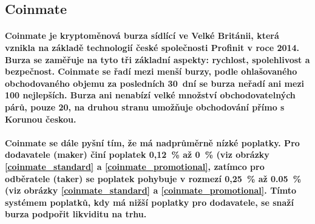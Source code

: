 \documentclass[thesis=B,czech]{FITthesis}[2019/03/21]
\begin{document}
\subsection{Coinmate}
\paragraph{
Coinmate je kryptoměnová burza sídlící ve Velké Británii, která vznikla na základě technologií české společnosti Profinit v roce 2014. Burza se zaměřuje na tyto tři základní aspekty: rychlost, spolehlivost a bezpečnost. Coinmate se řadí mezi menší burzy, podle ohlašovaného obchodovaného objemu za posledních 30~dní se burza neřadí ani mezi 100 nejlepších. \cite{coinmarketcap} Burza ani nenabízí velké množství obchodovatelných párů, pouze 20, na druhou stranu umožňuje obchodování přímo s Korunou českou. 
}
\paragraph{
Coinmate se dále pyšní tím, že má nadprůměrně nízké poplatky. Pro dodavatele (maker) činí poplatek 0,12~\% až 0~\% (viz obrázky \ref{coinmate_standard} a \ref{coinmate_promotional}, zatímco pro odběratele (taker) se poplatek pohybuje v rozmezí 0,25~\% až 0.05~\% (viz obrázky \ref{coinmate_standard} a \ref{coinmate_promotional}. Tímto systémem poplatků, kdy má nižší poplatky pro dodavatele, se snaží burza podpořit likviditu na trhu. \cite{cryptowisser_coinmate} \cite{coinmate_fees}
}
\end{document}
